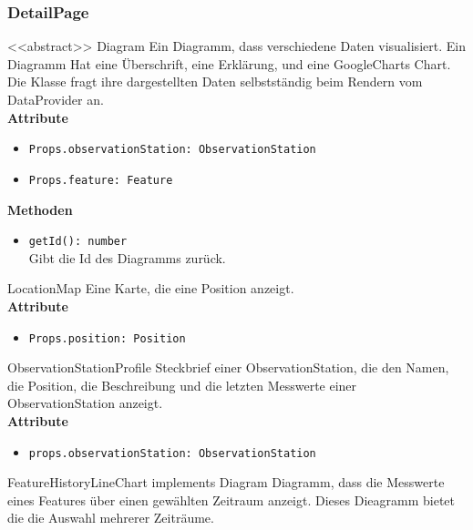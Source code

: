 \subsubsection{DetailPage}
    \begin{Class}{<<abstract>> Diagram}
        Ein Diagramm, dass verschiedene Daten visualisiert. Ein Diagramm Hat eine Überschrift, eine Erklärung, und eine GoogleCharts Chart. Die Klasse fragt ihre dargestellten Daten selbstständig beim Rendern vom DataProvider an.
        \bigskip\\
        \textbf{Attribute}
        \begin{itemize}
            \item \texttt{Props.observationStation: ObservationStation}
            \item \texttt{Props.feature: Feature}
        \end{itemize}
        \textbf{Methoden}
        \begin{itemize}
            \item \texttt{getId(): number}
            \\Gibt die Id des Diagramms zurück.
        \end{itemize}
        

    \end{Class}

    \begin{Class}{LocationMap}
        Eine Karte, die eine Position anzeigt.
        \bigskip\\
        \textbf{Attribute}
        \begin{itemize}
            \item \texttt{Props.position: Position}
        \end{itemize}
    \end{Class}

    \begin{Class}{ObservationStationProfile}
        Steckbrief einer ObservationStation, die den Namen, die Position, die Beschreibung und die letzten Messwerte einer ObservationStation anzeigt.
        \bigskip\\
        \textbf{Attribute}
        \begin{itemize}
            \item \texttt{props.observationStation: ObservationStation}
        \end{itemize}
    \end{Class}

    \begin{Class}{FeatureHistoryLineChart implements Diagram}
        Diagramm, dass die Messwerte eines Features über einen gewählten Zeitraum anzeigt. Dieses Dieagramm bietet die die Auswahl mehrerer Zeiträume.
    \end{Class}

